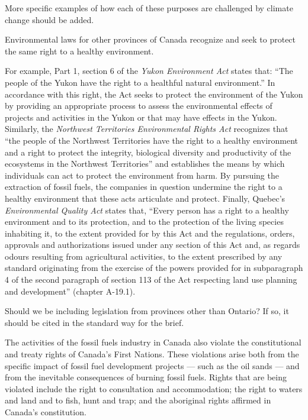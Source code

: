 \begin{vcom}
	More specific examples of how each of these purposes are challenged by climate change should be added.
\end{vcom}


Environmental laws for other provinces of Canada recognize and seek to protect the same right to a healthy environment.  



For example, Part 1, section 6 of the \emph{Yukon Environment Act} states that: ``The people of the Yukon have the right to a healthful natural environment.''   
In accordance with this right, the Act seeks to protect the environment of the Yukon by providing an appropriate process to assess the environmental effects of projects and activities in the Yukon or that may have effects in the Yukon. Similarly, the \emph{Northwest Territories Environmental Rights Act} recognizes that ``the people of the Northwest Territories have the right to a healthy environment and a right to protect the integrity, biological diversity and productivity of the ecosystems in the Northwest Territories'' and establishes the means by which individuals can act to protect the environment from harm. By pursuing the extraction of fossil fuels, the companies in question undermine the right to a healthy environment that these acts articulate and protect. Finally, Quebec’s \emph{Environmental Quality Act} states that, ``Every person has a right to a healthy environment and to its protection, and to the protection of the living species inhabiting it, to the extent provided for by this Act and the regulations, orders, approvals and authorizations issued under any section of this Act and, as regards odours resulting from agricultural activities, to the extent prescribed by any standard originating from the exercise of the powers provided for in subparagraph 4 of the second paragraph of section 113 of the Act respecting land use planning and development'' (chapter A-19.1).  

\begin{vcom}
	Should we be including legislation from provinces other than Ontario? If so, it should be cited in the standard way for the brief.
\end{vcom}

The activities of the fossil fuels industry in Canada also violate the constitutional and treaty rights of Canada's First Nations.
These violations arise both from the specific impact of fossil fuel development projects --- such as the oil sands --- and from the inevitable consequences of burning fossil fuels.
Rights that are being violated include the right to consultation and accommodation; the right to waters and land and to fish, hunt and trap; and the aboriginal rights affirmed in Canada's constitution.



